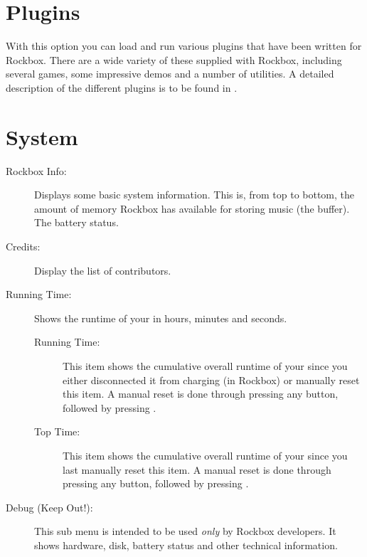 \section{Plugins}
  With this option you can load and run various plugins that have been
written for Rockbox. There are a wide variety of these supplied with
Rockbox, including several games, some impressive demos and a number of
utilities. A detailed description of the different plugins is to be found in
.

\section{\label{ref:Info}System}

\begin{description}
\item[Rockbox Info:]
  Displays some basic system information. This is, from top to bottom,
  the amount of memory Rockbox has available for storing music (the buffer).
  The battery status.
%

\item[Credits:]
  Display the list of contributors.

\item[Running Time:]
  Shows the runtime of your \dap{} in hours, minutes and seconds.
  \begin{description}
    \item[Running Time:]
        This item shows the cumulative overall runtime of your \dap{} since you 
        either disconnected it from charging (in Rockbox) or manually 
        reset this item. A manual reset is done through pressing any button, 
        followed by pressing \ActionStdOk{}.
    \item[Top Time:]
        This item shows the cumulative overall runtime of your \dap{} since you 
        last manually reset this item. A manual reset is done through pressing 
        any button, followed by pressing \ActionStdOk{}.
  \end{description}

\item[Debug (Keep Out!):]
  This sub menu is intended to be used \emph{only} by Rockbox developers.
  It shows hardware, disk, battery status and other technical information.  
\end{description}

